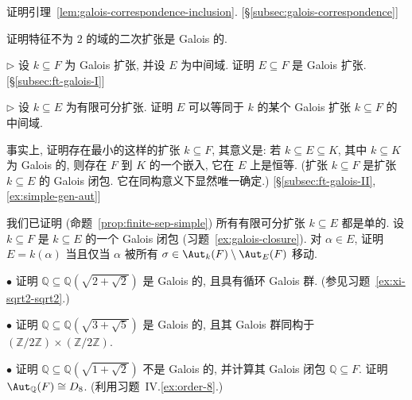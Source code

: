 \begin{prob}\label{ex:galois-ft-lemma}
证明引理~\ref{lem:galois-correspondence-inclusion}. [§\ref{subsec:galois-correspondence}]
\end{prob}

\begin{prob}\label{ex:quadratic-galois}
证明特征不为 $2$ 的域的二次扩张是 Galois 的.
\end{prob}

\begin{prob}\label{ex:intermediate-galois}
$\triangleright$ 设 $k\subseteq F$ 为 Galois 扩张, 并设 $E$ 为中间域. 证明 $E\subseteq F$ 是 Galois 扩张. [§\ref{subsec:ft-galois-I}]
\end{prob}

\begin{prob}\label{ex:galois-closure}
$\triangleright$ 设 $k\subseteq E$ 为有限可分扩张. 证明 $E$ 可以等同于 $k$ 的某个 Galois 扩张 $k\subseteq F$ 的中间域.

事实上, 证明存在最小的这样的扩张 $k\subseteq F$, 其意义是: 若 $k\subseteq E\subseteq K$, 其中 $k\subseteq K$ 为 Galois 的, 则存在 $F$ 到 $K$ 的一个嵌入, 它在 $E$ 上是恒等. (扩张 $k\subseteq F$ 是扩张 $k\subseteq E$ 的 Galois 闭包. 它在同构意义下显然唯一确定.) [§\ref{subsec:ft-galois-II}, \ref{ex:simple-gen-aut}]
\end{prob}

\begin{prob}\label{ex:simple-gen-aut}
我们已证明 (命题~\ref{prop:finite-sep-simple}) 所有有限可分扩张 $k\subseteq E$ 都是单的. 设 $k\subseteq F$ 是 $k\subseteq E$ 的一个 Galois 闭包 (习题~\ref{ex:galois-closure}). 对 $\alpha\in E$, 证明 $E=k(\alpha)$ 当且仅当 $\alpha$ 被所有 $\sigma\in\Aut_k(F)\setminus\Aut_E(F)$ 移动.
\end{prob}

\begin{prob}\label{ex:sqrt2sqrt2-galois}
$\bullet$ 证明 $\mathbb{Q}\subseteq\mathbb{Q}(\sqrt{2+\sqrt{2}})$ 是 Galois 的, 且具有循环 Galois 群. (参见习题~\ref{ex:xi-sqrt2-sqrt2}.)

$\bullet$ 证明 $\mathbb{Q}\subseteq\mathbb{Q}(\sqrt{3+\sqrt{5}})$ 是 Galois 的, 且其 Galois 群同构于 $(\mathbb{Z}/2\mathbb{Z})\times(\mathbb{Z}/2\mathbb{Z})$.

$\bullet$ 证明 $\mathbb{Q}\subseteq\mathbb{Q}(\sqrt{1+\sqrt{2}})$ 不是 Galois 的, 并计算其 Galois 闭包 $\mathbb{Q}\subseteq F$. 证明 $\Aut_{\mathbb{Q}}(F)\cong D_8$. (利用习题~IV.\ref{ex:order-8}.)
\end{prob}

